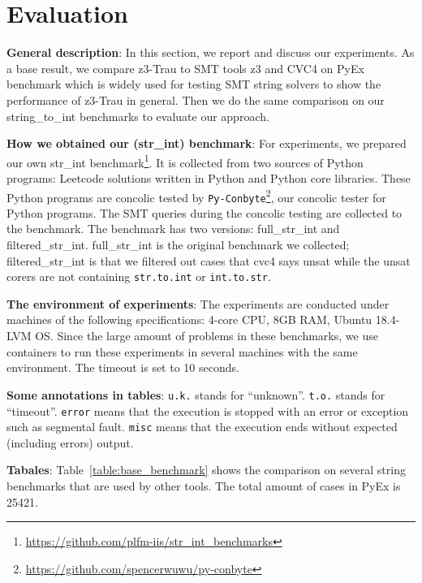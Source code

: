 \section{Evaluation}
\label{section:evaluation}


{\bf General description}:
In this section, we report and discuss our experiments. As a base result, we compare z3-Trau to SMT tools z3 and CVC4 on PyEx benchmark which is widely used for testing SMT string solvers to show the performance of z3-Trau in general. Then we do the same comparison on our string\_to\_int benchmarks to evaluate our approach.

{\bf How we obtained our (str\_int) benchmark}:
For experiments, we prepared our own str\_int benchmark\footnote{\url{https://github.com/plfm-iis/str_int_benchmarks}}. It is collected from two sources of Python programs: Leetcode solutions written in Python and Python core libraries. These Python programs are concolic tested by \texttt{Py-Conbyte}\footnote{\url{https://github.com/spencerwuwu/py-conbyte}}, our concolic tester for Python programs. The SMT queries during the concolic testing are collected to the benchmark. The benchmark has two versions: full\_str\_int and filtered\_str\_int. full\_str\_int is the original benchmark we collected; filtered\_str\_int is that we filtered out cases that cvc4 says unsat while the unsat corers are not containing \texttt{str.to.int} or \texttt{int.to.str}. 

{\bf The environment of experiments}:
The experiments are conducted under machines of the following specifications: 4-core CPU, 8GB RAM, Ubuntu 18.4-LVM OS. Since the large amount of problems in these benchmarks, we use containers to run these experiments in several machines with the same environment. The timeout is set to 10 seconds.

{\bf Some annotations in tables}:
\texttt{u.k.} stands for ``unknown''. \texttt{t.o.} stands for ``timeout''. \texttt{error} means that the execution is stopped with an error or exception such as segmental fault. \texttt{misc} means that the execution ends without expected (including errors) output.

{\bf Tabales}:
Table~\ref{table:base_benchmark} shows the comparison on several string benchmarks that are used by other tools. The total amount of cases in PyEx is 25421.

